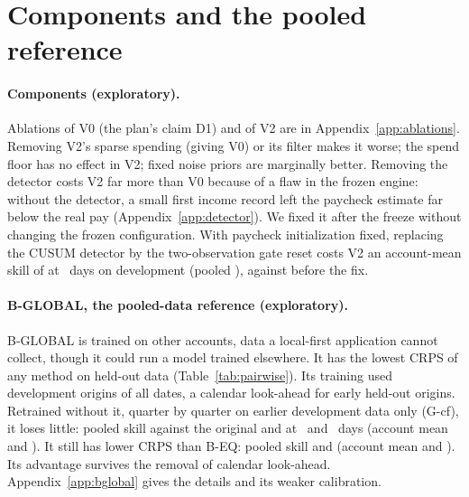 \section{Components and the pooled reference}
\label{sec:components}

\paragraph{Components (exploratory).} Ablations of V0 (the plan's claim D1)
and of V2 are in Appendix~\ref{app:ablations}. Removing V2's sparse
spending (giving V0) or its filter makes it worse; the spend floor has no
effect in V2; fixed noise priors are marginally better. Removing the
detector costs V2 far more than V0 because of a flaw in the frozen engine:
without the detector, a small first income record left the paycheck
estimate far below the real pay (Appendix~\ref{app:detector}). We fixed it
after the freeze without changing the frozen configuration. With paycheck
initialization fixed, replacing the CUSUM detector by the two-observation
gate reset costs V2 an account-mean skill of
 at \hC\ days on
development (pooled ),
against  before the fix.

\paragraph{B-GLOBAL, the pooled-data reference (exploratory).} B-GLOBAL
is trained on  other accounts, data a local-first
application cannot collect, though it could run a model trained
elsewhere. It has the lowest CRPS of any method on held-out data
(Table~\ref{tab:pairwise}). Its training used development origins of all
dates, a calendar look-ahead for early held-out origins. Retrained without
it, quarter by quarter on earlier development data only (G-cf), it loses
little: pooled skill against the original
 and
 at \hB\ and \hC\ days
(account mean  and
). It still has lower
CRPS than B-EQ: pooled skill
 and
 (account mean
 and
). Its advantage survives the
removal of calendar look-ahead. Appendix~\ref{app:bglobal} gives the
details and its weaker calibration.
